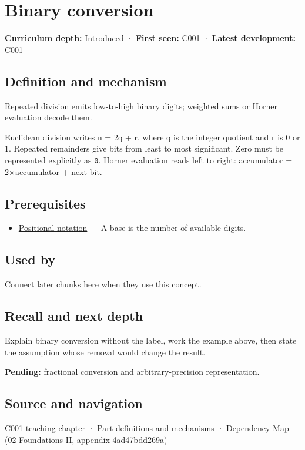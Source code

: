 \hypertarget{appendix-dc552784a2c0}{}
\section{Binary conversion}\label{appendix-dc552784a2c0-binary-conversion}

\textbf{Curriculum depth:} Introduced · \textbf{First seen:} C001 · \textbf{Latest development:} C001

\subsection{Definition and mechanism}\label{appendix-dc552784a2c0-definition-and-mechanism}

Repeated division emits low-to-high binary digits; weighted sums or Horner evaluation decode them.

Euclidean division writes n = 2q + r, where q is the integer quotient and r is 0 or 1. Repeated remainders give bits from least to most significant. Zero must be represented explicitly as \texttt{0}. Horner evaluation reads left to right: accumulator = 2×accumulator + next bit.

\subsection{Prerequisites}\label{appendix-dc552784a2c0-prerequisites}

\begin{itemize}
\tightlist
\item
  \hyperref[appendix-83c3f28f7bda]{Positional notation} --- A base is the number of available digits.
\end{itemize}

\subsection{Used by}\label{appendix-dc552784a2c0-used-by}

Connect later chunks here when they use this concept.

\subsection{Recall and next depth}\label{appendix-dc552784a2c0-recall-and-next-depth}

Explain binary conversion without the label, work the example above, then state the assumption whose removal would change the result.

\textbf{Pending:} fractional conversion and arbitrary-precision representation.

\subsection{Source and navigation}\label{appendix-dc552784a2c0-source-and-navigation}

\hyperref[01-foundations-i-ch001-from-a-signal-to-an-interpretation]{C001 teaching chapter} · \hyperref[appendix-fd090d982a15]{Part definitions and mechanisms} · \href{../02-Foundations-II/main.pdf\#nameddest=appendix-4ad47bdd269a}{Dependency Map (02-Foundations-II, appendix-4ad47bdd269a)}
